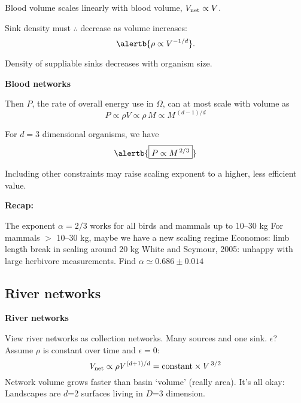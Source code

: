     Blood volume scales linearly with blood 
    volume\cite{stahl1967a}, $V_{\textnormal{net}} \propto V$.
  
    Sink density must $\therefore$ decrease as volume increases:
    $$
    \alertb{\rho \propto V^{-1/d}}.
    $$
  
    Density of suppliable sinks \alert{decreases} with organism size.
        



  \textbf{Blood networks}

  
   Then $P$, the rate of overall energy 
    use in $\Omega$, can at most scale with volume as
    $$
    P \propto \rho V 
    {
      \propto \rho \, M
    }
    {
      \propto M^{\, (d-1)/d}
    }
    $$
   
    For $d=3$ dimensional organisms, we have 
    $$\alertb{\boxed{ P \propto M^{\, 2/3}}}$$
   
    Including other constraints may raise scaling exponent
    to a higher, less efficient value.
      


  \textbf{Recap:}

  
   
    The exponent $\alpha = 2/3$ works for all birds and
    mammals up to 10--30 kg
   For mammals $>$ 10--30 kg, maybe we have a new scaling regime
   Economos: limb length break in scaling around 20 kg
   White and Seymour, 2005: unhappy with large herbivore measurements.
Find $\alpha \simeq 0.686 \pm 0.014$
  


\subsection{River networks}

  \textbf{River networks}

  
   View river networks as collection networks.
   Many sources and one sink.
   $\epsilon$?
   Assume $\rho$ is constant over time and $\epsilon=0$:
    $$V_{\textnormal{net}} \propto \rho V^{(d+1)/d} = \mbox{constant} \times V^{\, 3/2} $$
   Network volume grows faster than
    basin `volume' (really area).
   \alert{It's all okay:}\\ 
    Landscapes are $d$=2 surfaces living in $D$=3 dimension.
  

